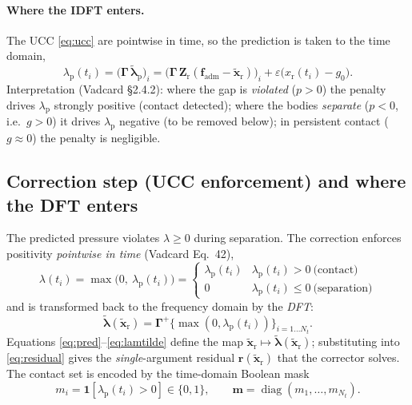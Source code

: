 \documentclass[11pt]{article}
\newcommand{\Gam}{\bm{\Gamma}}
\newcommand{\diag}{\operatorname{diag}}
\newcommand{\fadm}{\bm{f}_{\!\mathrm{adm}}}
\newcommand{\xr}{\tilde{\bm{x}}_{\mathrm r}}      %
\newcommand{\lamt}{\tilde{\bm{\lambda}}}          %
\newcommand{\Zr}{\bm{Z}_{\mathrm r}}
\begin{document}
\paragraph{Where the IDFT enters.} The UCC \eqref{eq:ucc} are pointwise in
time, so the prediction is taken to the time domain,
\begin{equation}
\lambda_{\mathrm p}(t_i)=\bigl(\Gam\,\lamt_{\mathrm p}\bigr)_i
=\bigl(\Gam\,\Zr(\fadm-\xr)\bigr)_i+\varepsilon\bigl(x_{\mathrm r}(t_i)-g_0\bigr).
\label{eq:predtime}
\end{equation}
Interpretation (Vadcard \S2.4.2): where the gap is \emph{violated}
($p>0$) the penalty drives $\lambda_{\mathrm p}$ strongly positive
(contact detected); where the bodies \emph{separate} ($p<0$, i.e.\
$g>0$) it drives $\lambda_{\mathrm p}$ negative (to be removed below);
in persistent contact ($g\approx0$) the penalty is negligible.

\subsection{Correction step (UCC enforcement) and where the DFT enters}
\label{sec:corr}
The predicted pressure violates $\lambda\ge0$ during separation. The
correction enforces positivity \emph{pointwise in time} (Vadcard Eq.~42),
\begin{equation}
\lambda(t_i)=\max\!\bigl(0,\ \lambda_{\mathrm p}(t_i)\bigr)
=\begin{cases}\lambda_{\mathrm p}(t_i)& \lambda_{\mathrm p}(t_i)>0\ \text{(contact)}\\[2pt]
0 & \lambda_{\mathrm p}(t_i)\le 0\ \text{(separation)}\end{cases}
\label{eq:corr}
\end{equation}
and is transformed back to the frequency domain by the \emph{DFT}:
\begin{equation}
\lamt(\xr)=\Gam^{+}\bigl\{\max(0,\lambda_{\mathrm p}(t_i))\bigr\}_{i=1\dots N_t}.
\label{eq:lamtilde}
\end{equation}
Equations \eqref{eq:pred}--\eqref{eq:lamtilde} define the map
$\xr\mapsto\lamt(\xr)$; substituting into \eqref{eq:residual} gives the
\emph{single}-argument residual $\bm r(\xr)$ that the corrector solves.
The contact set is encoded by the time-domain Boolean mask
\begin{equation}
m_i=\mathbf 1\!\left[\lambda_{\mathrm p}(t_i)>0\right]\in\{0,1\},
\qquad \bm m=\diag(m_1,\dots,m_{N_t}) .
\label{eq:mask}
\end{equation}
\end{document}
